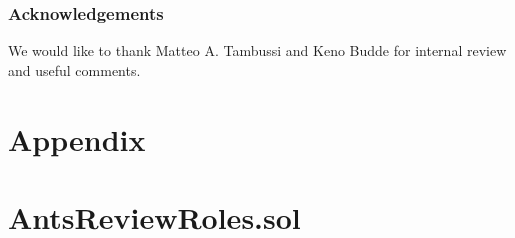 \documentclass[runningheads]{llncs}
\begin{document}
\subsubsection{Acknowledgements} We would like to thank Matteo A. Tambussi and Keno Budde for internal review and useful comments.

\newpage

\section{Appendix}

\appendix

\section{AntsReviewRoles.sol}
\label{appendix:a}
\end{document}
